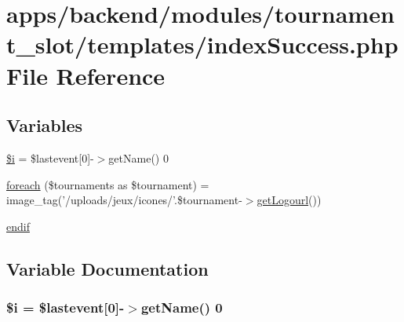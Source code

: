 \hypertarget{backend_2modules_2tournament__slot_2templates_2index_success_8php}{\section{apps/backend/modules/tournament\-\_\-slot/templates/index\-Success.php File Reference}
\label{backend_2modules_2tournament__slot_2templates_2index_success_8php}
}
\subsection*{Variables}
\begin{DoxyCompactItemize}
\item 
\hyperlink{backend_2modules_2tournament__slot_2templates_2index_success_8php_a83018d9153d17d91fbcf3bc10158d34f}{\$i} = \$lastevent\mbox{[}0\mbox{]}-\/$>$get\-Name() 0
\item 
\hyperlink{backend_2modules_2tournament__slot_2templates_2index_success_8php_af5a9b5f31e18b62a7ff910ce8e4702ac}{foreach} (\$tournaments as \$tournament) = image\-\_\-tag('/uploads/jeux/icones/'.\$tournament-\/$>$\hyperlink{backend_2modules_2tournament_2templates_2index_success_8php_a35941bec2f3cf7beef9b8010a1342325}{get\-Logourl}())
\item 
\hyperlink{backend_2modules_2tournament__slot_2templates_2index_success_8php_a82cd33ca97ff99f2fcc5e9c81d65251b}{endif}
\end{DoxyCompactItemize}


\subsection{Variable Documentation}
\hypertarget{backend_2modules_2tournament__slot_2templates_2index_success_8php_a83018d9153d17d91fbcf3bc10158d34f}{
\subsubsection[{\$i}]{\setlength{\rightskip}{0pt plus 5cm}\${\bf i} = \$lastevent\mbox{[}0\mbox{]}-\/$>$get\-Name() 0}}\label{backend_2modules_2tournament__slot_2templates_2index_success_8php_a83018d9153d17d91fbcf3bc10158d34f}


